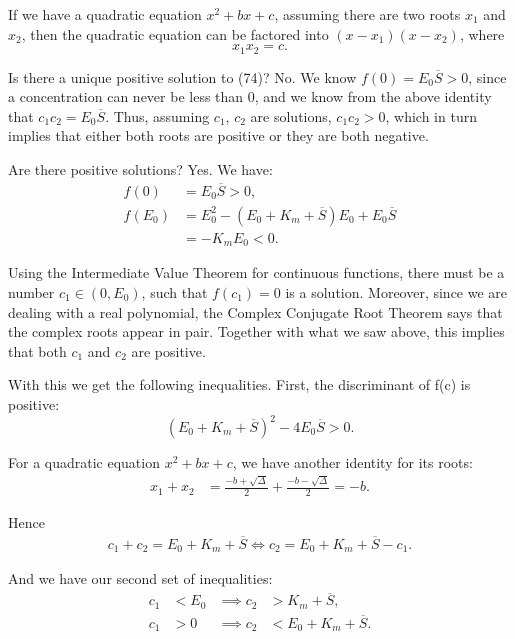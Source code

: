 \documentclass[12pt]{article}
\begin{document}
If we have a quadratic equation $x^2+bx+c$, assuming there are two
roots $x_1$ and $x_2$, then the quadratic equation can be factored
into $(x - x_1)(x - x_2)$, where
\begin{equation}
  x_1 x_2 = c.
\end{equation}

Is there a unique positive solution to (74)? No. We know $f(0) = E_0
\overline{S} > 0$, since a concentration can never be less than 0, and
we know from the above identity that $c_1 c_2 = E_0
\overline{S}$. Thus, assuming $c_1$, $c_2$ are solutions, $c_1 c_2 >
0$, which in turn implies that either both roots are positive or they
are both negative.

Are there positive solutions? Yes. We have:
\begin{align}
  f(0) &= E_0 \overline{S} > 0, \\
  f(E_0) &= E_0^2 - (E_0 + K_m + \overline{S})E_0 + E_0 \overline{S} \\
         &= - K_m E_0 < 0.
\end{align}

Using the Intermediate Value Theorem for continuous functions, there
must be a number $c_1 \in (0,E_0)$, such that $f(c_1) = 0$ is a
solution. Moreover, since we are dealing with a real polynomial, the
Complex Conjugate Root Theorem says that the complex roots appear in
pair. Together with what we saw above, this implies that both $c_1$
and $c_2$ are positive.

With this we get the following inequalities. First, the discriminant
of f(c) is positive:
\begin{equation}
  (E_0 + K_m + \overline{S})^2 - 4 E_0 \overline{S} > 0.
\end{equation}

For a quadratic equation $x^2 + bx + c$, we have another identity for
its roots:
\begin{align}
  x_1 + x_2 &= \frac{-b + \sqrt{\Delta}}{2} + \frac{-b - \sqrt{\Delta}}{2} = -b.
\end{align}

Hence
\begin{align}
  c_1 + c_2 = E_0 + K_m + \overline{S} \iff c_2 = E_0 + K_m + \overline{S} - c_1.
\end{align}

And we have our second set of inequalities:
\begin{align}
  c_1 &< E_0 &\implies c_2 &> K_m + \overline{S}, \\
  c_1 &> 0 &\implies c_2 &< E_0 + K_m + \overline{S}.
\end{align}
\end{document}
